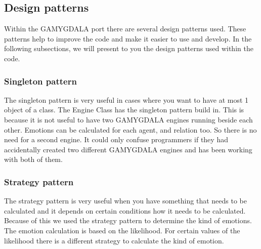 \subsection{Design patterns}
Within the GAMYGDALA port there are several design patterns used. These patterns help to improve the code and make it easier to use and develop. In the following subsections, we will present to you the design patterns used within the code.

	\subsubsection{Singleton pattern}
The singleton pattern is very useful in cases where you want to have at most 1 object 	of a class. The Engine Class has the singleton pattern build in. This is because it is not useful to have two GAMYGDALA engines running beside each other. Emotions can be calculated for each agent, and relation too. So there is no need for a second engine. It could only confuse programmers if they had accidentally created two different GAMYGDALA engines and has been working with both of them.  
  
	\subsubsection{Strategy pattern}
The strategy pattern is very useful when you have something that needs to be calculated and it depends on certain conditions how it needs to be calculated. Because of this we used the strategy pattern to determine the kind of emotions. The emotion calculation is based on the likelihood. For certain values of the likelihood there is a different strategy to calculate the kind of emotion.